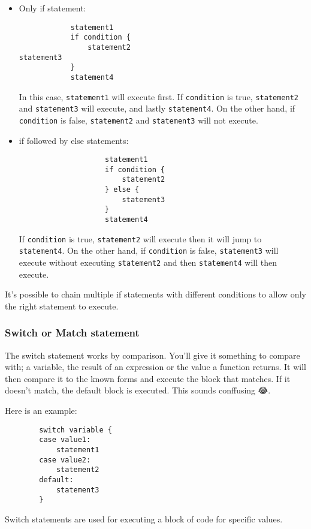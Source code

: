 \documentclass{book}
\begin{document}
\begin{itemize}
	\item Only if statement:

		\begin{verbatim}
			statement1
			if condition {
				statement2
statement3
			}
			statement4
		\end{verbatim}

		In this case, \verb|statement1| will execute first. If \verb|condition| is true, \verb|statement2| and \verb|statement3| will execute, and lastly \verb|statement4|. On the other hand, if \verb|condition| is false, \verb|statement2| and \verb|statement3| will not execute.
		\item if followed by else statements:

			\begin{verbatim}
					statement1
					if condition {
						statement2
					} else {
						statement3
					}
					statement4
			\end{verbatim}

			If \verb|condition| is true, \verb|statement2| will execute then it will jump to \verb|statement4|. On the other hand, if \verb|condition| is false, \verb|statement3| will execute without executing \verb|statement2| and then \verb|statement4| will then execute.

\end{itemize}

It's possible to chain multiple if statements with different conditions to allow only the right statement to execute.

\subsubsection{Switch or Match statement}
The switch statement works by comparison. You'll give it something to compare with; a variable, the result of an expression or the value a function returns. It will then compare it to the known forms and execute the block that matches. If it doesn't match, the default block is executed. This sounds conffusing 😂.

Here is an example:

\begin{verbatim}
		switch variable {
		case value1:
			statement1
		case value2:
			statement2
		default:
			statement3
		}
\end{verbatim}

Switch statements are used for executing a block of code for specific values.
\end{document}

